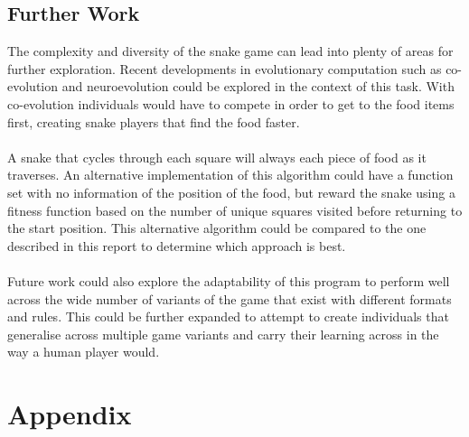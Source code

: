 \documentclass{article}
\begin{document}
\subsection{Further Work}
The complexity and diversity of the snake game can lead into plenty of areas for further exploration. Recent developments in evolutionary computation such as co-evolution and neuroevolution could be explored in the context of this task. With co-evolution individuals would have to compete in order to get to the food items first, creating snake players that find the food faster.
\\\\
A snake that cycles through each square will always each piece of food as it traverses. An alternative implementation of this algorithm could have a function set with no information of the position of the food, but reward the snake using a fitness function based on the number of unique squares visited before returning to the start position. This alternative algorithm could be compared to the one described in this report to determine which approach is best.
\\\\
Future work could also explore the adaptability of this program to perform well across the wide number of variants of the game that exist with different formats and rules. This could be further expanded to attempt to create individuals that generalise across multiple game variants and carry their learning across in the way a human player would.

\newpage
\raggedright
{}


\newpage
\section{Appendix}
\end{document}
